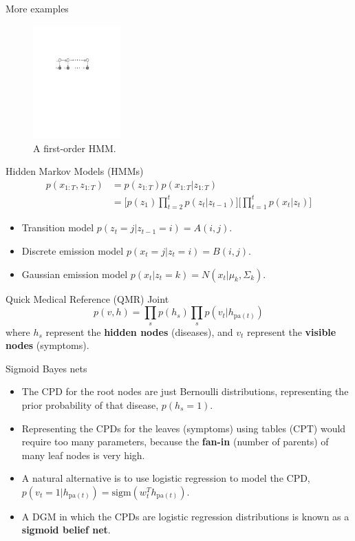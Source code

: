 \documentclass[10pt,mathserif]{beamer}
\begin{document}
\begin{frame}{More examples}
\begin{figure}[h]
\centering
\includegraphics[width=0.3\textwidth]{ldsDGM}
\caption{A first-order HMM.}
\end{figure}

Hidden Markov Models (HMMs)
\begin{equation}
    \begin{split}
        p(x_{1:T} , z_{1:T} ) & = p(z_{1:T} )p(x_{1:T} |z_{1:T} )\\
        & = \bigg[p(z_1)\prod_{t=2}^t p(z_t |z_{t-1})\bigg]\bigg[ \prod_{t=1}^t p(x_t |z_t )\bigg]
    \end{split}
\end{equation}

\begin{itemize}
    \item  Transition model $p(z_t = j|z_{t-1} = i) = A(i,j)$.
    \item  Discrete emission model $p(x_t = j|z_t = i) = B(i,j)$.
    \item  Gaussian emission model $p(x_t|z_t = k) = N(x_t|\mu_k,\Sigma_k)$.
\end{itemize}   
\end{frame}

\begin{frame}{Quick Medical Reference (QMR)}
Joint
\begin{equation}
    p(v,h) = \prod_s p(h_s) \prod_s p(v_t|h_{\text{pa}(t)})
\end{equation}
where $h_s$ represent the \textbf{hidden nodes} (diseases), and $v_t$ represent the \textbf{visible nodes} (symptoms).
\end{frame}

\begin{frame}{Sigmoid Bayes nets}
\begin{itemize}
    \item  The CPD for the root nodes are just Bernoulli distributions, representing the prior probability of that disease, $p(h_s = 1)$.
    \item  Representing the CPDs for the leaves (symptoms) using tables (CPT) would require too many parameters, because the \textbf{fan-in} (number of parents) of many leaf nodes is very high.
    \item  A natural alternative is to use logistic regression to model the CPD, $p(v_t = 1|h_{\text{pa}(t)}) = \text{sigm}(w_t^T h_{\text{pa}(t)})$.
    \item  A DGM in which the CPDs are logistic regression distributions is known as a \textbf{sigmoid belief net}.
\end{itemize} 
\end{frame}
\end{document}
